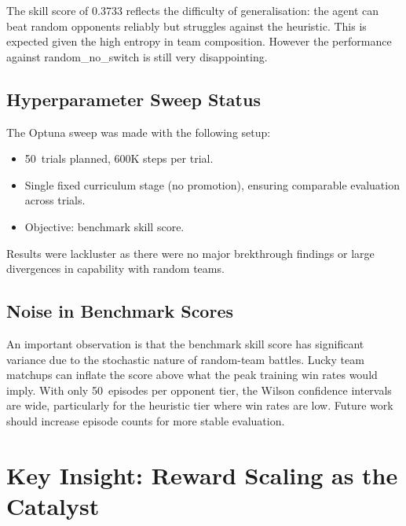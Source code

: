 
The skill score of 0.3733 reflects the difficulty of generalisation: the
agent can beat random opponents reliably but struggles against the heuristic.
This is expected given the high entropy in team composition.  However the performance against random\_no\_switch is still very disappointing.

\subsection{Hyperparameter Sweep Status}

The Optuna sweep was made with the following setup:
\begin{itemize}
  \item 50~trials planned, 600K steps per trial.
  \item Single fixed curriculum stage (no promotion), ensuring comparable
        evaluation across trials.
  \item Objective: benchmark skill score.
\end{itemize}

Results were lackluster as there were no major brekthrough findings or large divergences in capability with random teams.


\subsection{Noise in Benchmark Scores}

An important observation is that the benchmark skill score has significant
variance due to the stochastic nature of random-team battles.  Lucky team
matchups can inflate the score above what the peak training win rates would
imply.  With only 50~episodes per opponent tier, the Wilson confidence
intervals are wide, particularly for the heuristic tier where win rates are
low.  Future work should increase episode counts for more stable evaluation.

\section{Key Insight: Reward Scaling as the Catalyst}

